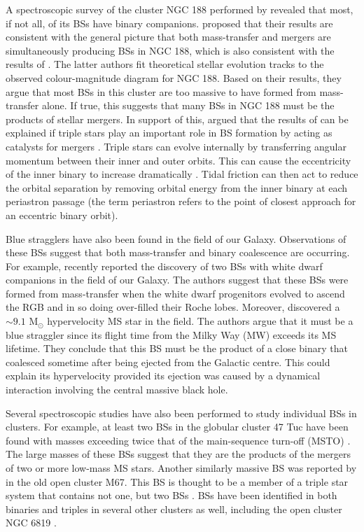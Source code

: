 A spectroscopic survey of the cluster NGC 188 performed by
\citet{mathieu09} revealed that most, if not all, of its BSs have
binary companions.  \citet{mathieu09} proposed that their results are
consistent with the general picture that both mass-transfer 
and mergers are simultaneously producing BSs in NGC 188, which is also
consistent with the results of \citet{chen08a}.  The latter authors fit
theoretical stellar evolution tracks to the observed colour-magnitude
diagram for NGC 188.  Based on their results, they argue that most BSs
in this cluster are too massive to have formed from mass-transfer
alone.  If true, this suggests that many BSs in NGC 188 must be the
products of stellar mergers.  In support of this, \citet{perets09}
argued that the results of \citet{mathieu09} can be
explained if triple stars play an important 
role in BS formation by acting as catalysts for mergers
\citep{perets09}.  Triple stars
can evolve internally by transferring angular momentum between their
inner and outer orbits.  This can cause the eccentricity of the inner
binary to increase dramatically \citep{kozai62}.  Tidal 
friction can then act to reduce the orbital separation by removing
orbital energy from the inner binary at each periastron passage
\citep{fabrycky07} (the term periastron refers to the point of closest
approach for an eccentric binary orbit).

Blue stragglers have also been found in the field of our Galaxy.
Observations of these BSs suggest that both mass-transfer and binary
coalescence are occurring.  For example,
\citet{distefano10} recently reported the discovery of two BSs with
white dwarf companions in the field of our Galaxy.  The authors
suggest that these BSs were
formed from mass-transfer when the white dwarf progenitors
evolved to ascend the RGB and in so doing over-filled their
Roche lobes.  Moreover, \citet{brown10} discovered a $\sim 9.1$
M$_{\odot}$ hypervelocity MS star in the field.  The
authors argue that it must be a blue straggler since its flight time
from the Milky Way (MW) exceeds its MS lifetime.  They conclude that
this BS must 
be the product of a close binary that coalesced sometime after being
ejected from the Galactic centre.  This could explain its
hypervelocity provided its ejection was caused by a dynamical
interaction involving the central massive black hole.

Several spectroscopic studies have also been performed to study individual
BSs in clusters.  For example, at
least two BSs in the globular cluster 47 Tuc have been found with masses
exceeding twice that of the main-sequence turn-off (MSTO)
\citep{shara97, knigge08}.  The large masses of these BSs suggest that
they are the products of the mergers of two or more low-mass MS stars.
Another similarly massive BS was reported by \citet{vandenberg01} in
the old open cluster M67.  This BS is thought to be a member of a
triple star system that contains not one, but two BSs
\citep{sandquist03}.  BSs have been identified in both binaries and
triples in several other clusters as well, including the open cluster
NGC 6819 \citep{talamantes10}.

